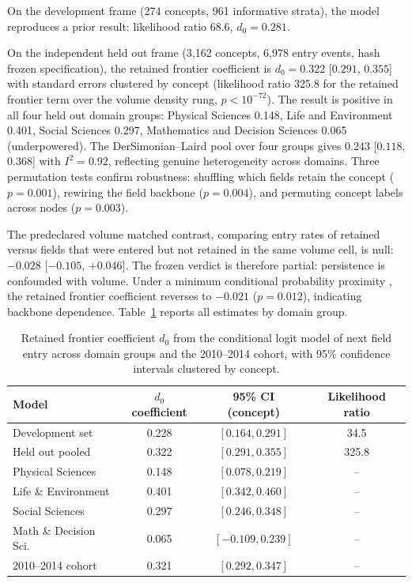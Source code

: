 \documentclass[11pt,letterpaper]{article}
\begin{document}
On the development frame (274 concepts, 961 informative strata), the model
reproduces a prior result: likelihood ratio 68.6, $d_0 = 0.281$.

On the independent held out frame (3,162 concepts, 6,978 entry events,
hash frozen specification), the retained frontier coefficient is $d_0 = 0.322$
[$0.291$, $0.355$] with standard errors clustered by concept (likelihood ratio
325.8 for the retained frontier term over the volume density rung,
$p < 10^{-72}$). The result is positive in all four
held out domain groups: Physical Sciences 0.148, Life and Environment 0.401,
Social Sciences 0.297, Mathematics and Decision Sciences 0.065
(underpowered). The DerSimonian--Laird pool over four groups gives 0.243
[$0.118$, $0.368$] with $I^2 = 0.92$, reflecting genuine heterogeneity across
domains. Three permutation tests confirm robustness: shuffling which fields
retain the concept ($p = 0.001$), rewiring the field backbone ($p = 0.004$),
and permuting concept labels across nodes ($p = 0.003$).

The predeclared volume matched contrast, comparing entry rates of retained
versus fields that were entered but not retained in the same volume cell, is null:
$-0.028$ [$-0.105$, $+0.046$]. The frozen verdict is therefore partial:
persistence is confounded with volume. Under a minimum conditional probability
proximity \citep{Hidalgo2007}, the retained frontier coefficient reverses to
$-0.021$ ($p = 0.012$), indicating backbone dependence.
Table~\ref{tab:retained_frontier} reports all estimates by domain group.

\begin{table}[!htbp]
\centering
\small
\caption{Retained frontier coefficient $d_0$ from the conditional logit model
of next field entry across domain groups and the 2010--2014 cohort, with 95\%
confidence intervals clustered by concept.}
\label{tab:retained_frontier}
\begin{tabular}{l c c c}
\toprule
Model & $d_0$ coefficient & 95\% CI (concept) & Likelihood ratio \\
\midrule
Development set & 0.228 & $[0.164, 0.291]$ & 34.5 \\
Held out pooled & 0.322 & $[0.291, 0.355]$ & 325.8 \\
Physical Sciences & 0.148 & $[0.078, 0.219]$ & -- \\
Life \& Environment & 0.401 & $[0.342, 0.460]$ & -- \\
Social Sciences & 0.297 & $[0.246, 0.348]$ & -- \\
Math \& Decision Sci. & 0.065 & $[-0.109, 0.239]$ & -- \\
2010--2014 cohort & 0.321 & $[0.292, 0.347]$ & -- \\
\bottomrule
\end{tabular}
\end{table}
\end{document}
